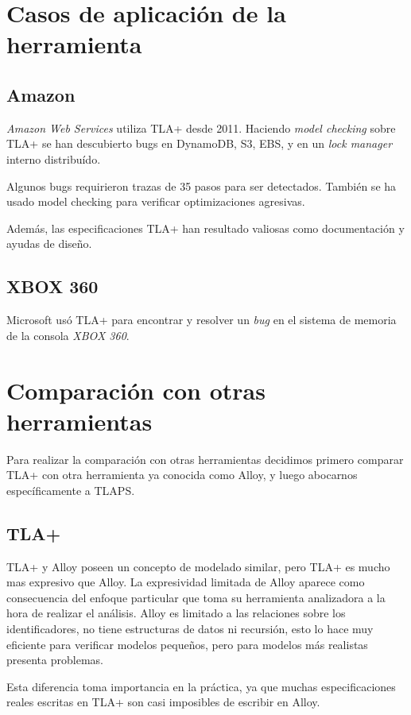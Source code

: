 \documentclass[spanish]{llncs}
\begin{document}
\section{Casos de aplicación de la herramienta}


\subsection{Amazon}
\textit{Amazon Web Services} utiliza TLA+ desde 2011. Haciendo \textit{model checking} sobre TLA+ se han descubierto bugs
en DynamoDB, S3, EBS, y en un \textit{lock manager} interno distribuído.

Algunos bugs requirieron trazas de 35 pasos para ser detectados. También se ha usado model checking para verificar optimizaciones agresivas.

Además, las especificaciones TLA+ han resultado valiosas como documentación y ayudas de diseño.
\cite{amazon}

\subsection{XBOX 360}
Microsoft usó TLA+ para encontrar y resolver un \textit{bug} en el sistema de memoria de la consola \textit{XBOX 360}.
\cite{xbox360}


\section{Comparación con otras herramientas}
Para realizar la comparación con otras herramientas decidimos primero comparar TLA+ con otra herramienta ya conocida como Alloy,
y luego abocarnos específicamente a TLAPS.

  \subsection{TLA+}
  TLA+ y Alloy poseen un concepto de modelado similar, pero TLA+ es mucho mas expresivo que Alloy. La expresividad limitada de Alloy aparece como consecuencia del enfoque particular que toma su herramienta analizadora a la hora de realizar el análisis. Alloy es limitado a las relaciones sobre los identificadores, no tiene estructuras de datos ni recursión, esto lo hace muy eficiente para verificar modelos pequeños, pero para modelos más realistas presenta problemas. 
  
  Esta diferencia toma importancia en la práctica, ya que muchas especificaciones reales escritas en TLA+ son 
  casi imposibles de escribir en Alloy.
\end{document}
